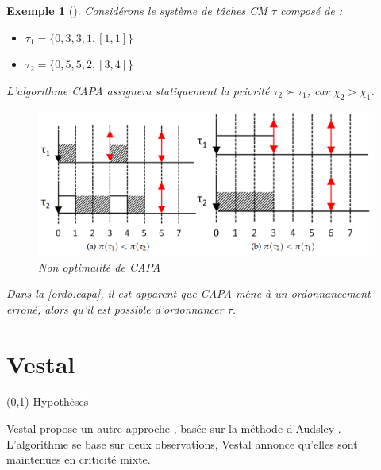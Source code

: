 \documentclass[12pt,a4paper,oneside]{book}
\theoremstyle{break}
\newtheorem{exem}{Exemple}[chapter]
\theoremstyle{breakplain}
\begin{document}
\pagebreak

\begin{exem}[\cite{santy2012ordonnancement}]
Considérons le système de tâches CM $\tau$ composé de :
\begin{itemize}
\item $\tau_1 = \{0,3,3,1,[1,1]\}$
\item $\tau_2 = \{0,5,5,2,[3,4]\}$
\end{itemize}

L'algorithme \textit{CAPA} assignera statiquement la priorité $\tau_2 \succ \tau_1$, car $\chi_2 > \chi_1$.

\begin{figure}[h]
\centering
\includegraphics[scale=0.25]{images/capa.png}
\caption{Non optimalité de CAPA \cite{santy2012ordonnancement}}
\label{ordo:capa}
\end{figure}

Dans la \autoref{ordo:capa}, il est apparent que \textit{CAPA} mène à un ordonnancement erroné, alors qu'il est possible d'ordonnancer $\tau$.
\end{exem}

\section{Vestal}
\label{vestal}

\begin{center}
\boxput*(0,1){
\colorbox{white}{Hypothèses}
}{
\setlength{\fboxsep}{6pt}
}
\end{center}

Vestal propose un autre approche \cite{vestal2007preemptive}, basée sur la méthode d'Audsley \cite{audsley1991optimal}. L'algorithme se base sur deux observations, Vestal annonce qu'elles sont maintenues en criticité mixte.
\end{document}
